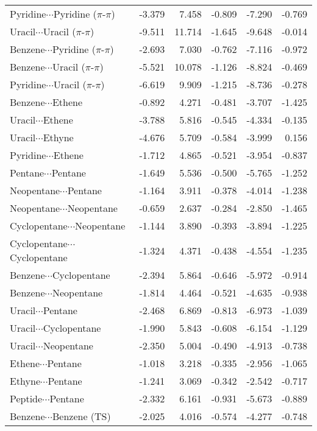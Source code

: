 \begin{longtable}{lrrrrr}
Pyridine$\cdots$Pyridine ($\pi$-$\pi$) & -3.379 & 7.458 & -0.809 & -7.290 & -0.769 \\
Uracil$\cdots$Uracil ($\pi$-$\pi$) & -9.511 & 11.714 & -1.645 & -9.648 & -0.014 \\
Benzene$\cdots$Pyridine ($\pi$-$\pi$) & -2.693 & 7.030 & -0.762 & -7.116 & -0.972 \\
Benzene$\cdots$Uracil ($\pi$-$\pi$) & -5.521 & 10.078 & -1.126 & -8.824 & -0.469 \\
Pyridine$\cdots$Uracil ($\pi$-$\pi$) & -6.619 & 9.909 & -1.215 & -8.736 & -0.278 \\
Benzene$\cdots$Ethene & -0.892 & 4.271 & -0.481 & -3.707 & -1.425 \\
Uracil$\cdots$Ethene & -3.788 & 5.816 & -0.545 & -4.334 & -0.135 \\
Uracil$\cdots$Ethyne & -4.676 & 5.709 & -0.584 & -3.999 & 0.156 \\
Pyridine$\cdots$Ethene & -1.712 & 4.865 & -0.521 & -3.954 & -0.837 \\
Pentane$\cdots$Pentane & -1.649 & 5.536 & -0.500 & -5.765 & -1.252 \\
Neopentane$\cdots$Pentane & -1.164 & 3.911 & -0.378 & -4.014 & -1.238 \\
Neopentane$\cdots$Neopentane & -0.659 & 2.637 & -0.284 & -2.850 & -1.465 \\
Cyclopentane$\cdots$Neopentane & -1.144 & 3.890 & -0.393 & -3.894 & -1.225 \\
Cyclopentane$\cdots$Cyclopentane & -1.324 & 4.371 & -0.438 & -4.554 & -1.235 \\
Benzene$\cdots$Cyclopentane & -2.394 & 5.864 & -0.646 & -5.972 & -0.914 \\
Benzene$\cdots$Neopentane & -1.814 & 4.464 & -0.521 & -4.635 & -0.938 \\
Uracil$\cdots$Pentane & -2.468 & 6.869 & -0.813 & -6.973 & -1.039 \\
Uracil$\cdots$Cyclopentane & -1.990 & 5.843 & -0.608 & -6.154 & -1.129 \\
Uracil$\cdots$Neopentane & -2.350 & 5.004 & -0.490 & -4.913 & -0.738 \\
Ethene$\cdots$Pentane & -1.018 & 3.218 & -0.335 & -2.956 & -1.065 \\
Ethyne$\cdots$Pentane & -1.241 & 3.069 & -0.342 & -2.542 & -0.717 \\
Peptide$\cdots$Pentane & -2.332 & 6.161 & -0.931 & -5.673 & -0.889 \\
Benzene$\cdots$Benzene (TS) & -2.025 & 4.016 & -0.574 & -4.277 & -0.748 \\

\end{longtable}
